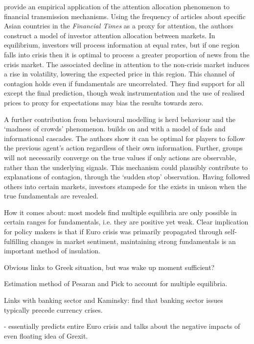 \documentclass[../base.tex]{subfiles}
\begin{document}
\cite{mondria2013financial} provide an empirical application of the attention allocation phenomenon to financial transmission mechanisms. Using the frequency of articles about specific Asian countries in the \textit{Financial Times} as a proxy for attention, the authors construct a model of investor attention allocation between markets. In equilibrium, investors will process information at equal rates, but if one region falls into crisis then it is optimal to process a greater proportion of news from the crisis market. The associated decline in attention to the non-crisis market induces a rise in volatility, lowering the expected price in this region. This channel of contagion holds even if fundamentals are uncorrelated. They find support for all except the final prediction, though weak instrumentation and the use of realised prices to proxy for expectations may bias the results towards zero. 

A further contribution from behavioural modelling is herd behaviour and the `madness of crowds' phenomenon. \cite{bikhchandani1998learning} builds on \cite{bikhchandani1992theory} and \cite{banerjee1992simple} with a model of fads and informational cascades. The authors show it can be optimal for players to follow the previous agent's action regardless of their own information. Further, groups will not necessarily converge on the true values if only actions are observable, rather than the underlying signals. This mechanism could plausibly contribute to explanations of contagion, through the  \cite{kaminsky2003unholy} `sudden stop' observation. Having followed others into certain markets, investors stampede for the exists in unison when the true fundamentals are revealed.

How it comes about: most models find multiple equilibria are only possible in certain ranges for fundamentals, i.e. they are positive yet weak. Clear implication for policy makers is that if Euro crisis was primarily propagated through self-fulfilling changes in market sentiment, maintaining strong fundamentals is an important method of insulation. 


Obvious links to Greek situation, but was wake up moment sufficient?

Estimation method of Pesaran and Pick to account for multiple equilibria.

Links with banking sector \cite{alter2012credit} and \cite{kaminsky1999twin}
Kaminsky: find that banking sector issues typically precede currency crises.


\cite{obstfeld1997destabilizing} - essentially predicts entire Euro crisis and talks about the negative impacts of even floating idea of Grexit.
\end{document}
